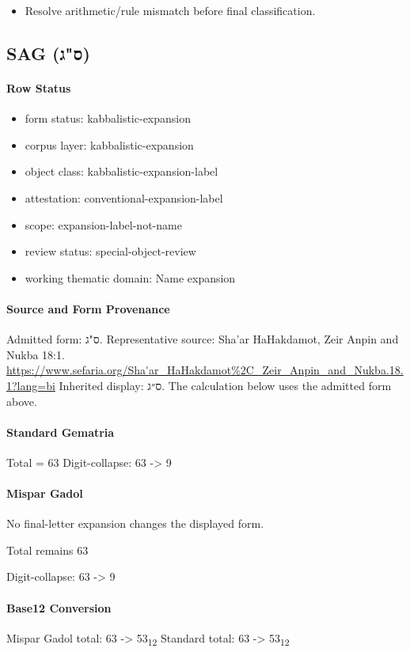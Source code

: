 \begin{itemize}
\item Resolve arithmetic/rule mismatch before final classification.
\end{itemize}

\subsection{SAG (ס"ג)}
\paragraph{Row Status}
\begin{itemize}
\item form status: kabbalistic-expansion
\item corpus layer: kabbalistic-expansion
\item object class: kabbalistic-expansion-label
\item attestation: conventional-expansion-label
\item scope: expansion-label-not-name
\item review status: special-object-review
\item working thematic domain: Name expansion
\end{itemize}
\paragraph{Source and Form Provenance}
Admitted form: ס"ג.
Representative source: Sha'ar HaHakdamot, Zeir Anpin and Nukba 18:1.
\url{https://www.sefaria.org/Sha'ar_HaHakdamot%2C_Zeir_Anpin_and_Nukba.18.1?lang=bi}
Inherited display: ס״ג. The calculation below uses the admitted form above.
\paragraph{Standard Gematria}
Total = 63
Digit-collapse: 63 -> 9
\paragraph{Mispar Gadol}
No final-letter expansion changes the displayed form.

Total remains 63

Digit-collapse: 63 -> 9
\paragraph{Base12 Conversion}
Mispar Gadol total: 63 -> 53\textsubscript{12}
Standard total: 63 -> 53\textsubscript{12}
